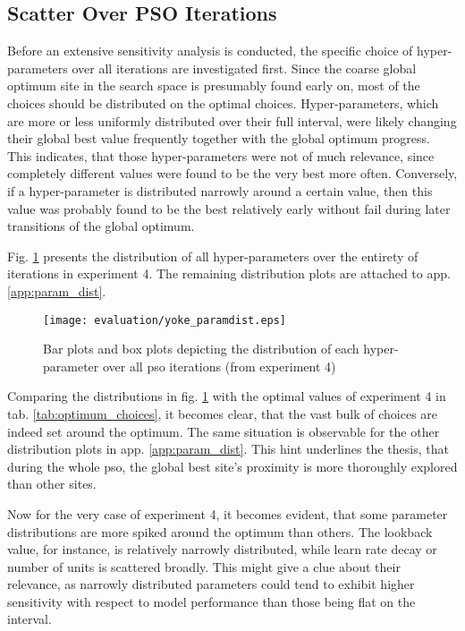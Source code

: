\subsection{Scatter Over PSO Iterations}
Before an extensive sensitivity analysis is conducted, the specific choice of hyper-parameters over all iterations are investigated first.
Since the coarse global optimum site in the search space is presumably found early on, most of the choices should be distributed on the optimal choices.
Hyper-parameters, which are more or less uniformly distributed over their full interval, were likely changing their global best value frequently together with the global optimum progress.
This indicates, that those hyper-parameters were not of much relevance, since completely different values were found to be the very best more often.
Conversely, if a hyper-parameter is distributed narrowly around a certain value, then this value was probably found to be the best relatively early without fail during later transitions of the global optimum.

Fig. \ref{fig:param_dist} presents the distribution of all hyper-parameters over the entirety of iterations in experiment 4.
The remaining distribution plots are attached to app. \ref{app:param_dist}.
\begin{figure}[!bth]
	\centering
	\texttt{[image: evaluation/yoke\_paramdist.eps]}
	\caption{Bar plots and box plots depicting the distribution of each hyper-parameter over all \gls{pso} iterations (from experiment 4)}
	\label{fig:param_dist}
\end{figure}

Comparing the distributions in fig. \ref{fig:param_dist} with the optimal values of experiment 4 in tab. \ref{tab:optimum_choices}, it becomes clear, that the vast bulk of choices are indeed set around the optimum.
The same situation is observable for the other distribution plots in app. \ref{app:param_dist}.
This hint underlines the thesis, that during the whole \gls{pso}, the global best site's proximity is more thoroughly explored than other sites.

Now for the very case of experiment 4, it becomes evident, that some parameter distributions are more spiked around the optimum than others.
The lookback value, for instance, is relatively narrowly distributed, while learn rate decay or number of units is scattered broadly.
This might give a clue about their relevance, as narrowly distributed parameters could tend to exhibit higher sensitivity with respect to model performance than those being flat on the interval.

